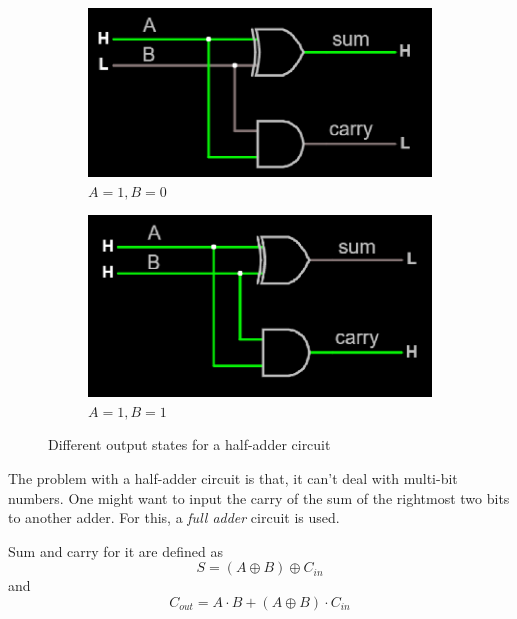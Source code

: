 \documentclass{article}
\begin{document}
\begin{figure}[H]
		\begin{subfigure}[b]{0.4\textwidth}
			\centering
			\includegraphics[width=\textwidth]{half_adder/half_adder_10.png}
			\caption{$A=1, B=0$}
		\end{subfigure}
		\begin{subfigure}[b]{0.4\textwidth}
			\includegraphics[width=\textwidth]{half_adder/half_adder_11.png}
			\caption{$A=1, B=1$}
		\end{subfigure}
		\caption{Different output states for a half-adder circuit}
		\label{fig:halfadder}
	\end{figure}
	
	The problem with a half-adder circuit is that, it can't deal with multi-bit numbers. One might want to input the carry of the sum of the rightmost two bits to another adder. For this, a \textit{full adder} circuit is used.
	
	Sum and carry for it are defined as $$S = (A \oplus B) \oplus C_{in}$$ and $$C_{out} = A\cdot B + (A\oplus B)\cdot C_{in}$$
	
\end{document}
